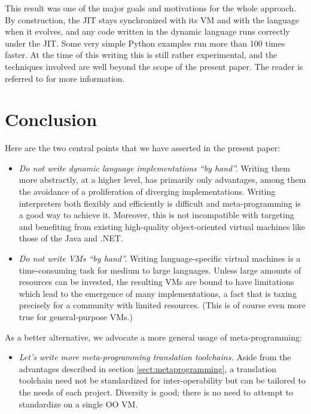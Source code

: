 \documentclass{llncs}
\begin{document}
This result was one of the major goals and motivations for the whole
approach.  By construction, the JIT stays synchronized with its VM
and with the language when it evolves,
and any code written in the dynamic language runs
correctly under the JIT.  Some very simple Python examples run more than
100 times faster.  At the time of this writing this is still rather
experimental, and the techniques involved are well beyond the scope of
the present paper.  The reader is referred to \cite{D08.2} for more
information.


\section{Conclusion}

Here are the two central points that we have asserted in the present
paper:

\begin{itemize}
\item \emph{Do not write dynamic language implementations ``by hand''.}
Writing them more abstractly, at a higher level, has primarily only
advantages, among them the avoidance of a proliferation of diverging
implementations.  Writing interpreters both flexibly and efficiently
is difficult and meta-programming is a good way to achieve it.
Moreover, this is not incompatible with targeting and benefiting from
existing high-quality object-oriented virtual machines like those of the Java and .NET.


\item \emph{Do not write VMs ``by hand''.}
Writing language-specific virtual machines is a time-consuming task for
medium to large languages.  Unless large amounts of resources can be
invested, the resulting VMs are bound to have limitations which lead to
the emergence of many implementations, a fact that is taxing precisely
for a community with limited resources.  (This is of course even more
true for general-purpose VMs.)
\end{itemize}

\noindent
As a better alternative, we advocate a more general usage of
meta-programming:

\begin{itemize}
\item \emph{Let's write more meta-programming translation toolchains.}
Aside from the advantages described in section
\ref{sect:metaprogramming}, a translation toolchain need not be
standardized for inter-operability but can be tailored to the needs of
each project.  Diversity is good; there is no need to attempt to
standardize on a single OO VM.
\end{itemize}
\end{document}
